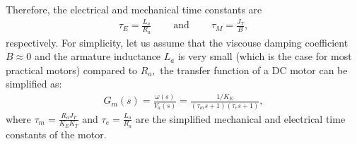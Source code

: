 %
Therefore, the electrical and mechanical time constants are %
%
\begin{align}
  \label{eq:timeConstants}
  \tau_E = \frac{L_a}{R_a}~\qquad\mathrm{and}~\qquad \tau_M = \frac{J_T}{B},
\end{align}
%
respectively. %
%
For simplicity, let us assume that the viscouse damping coefficient $B\approx 0$ and the armature inductance $L_a$ is very small (which is the case for most practical motors) compared to $R_a,$ the transfer function of a DC motor can be simplified as: %
%
\begin{align}
  G_m(s) = \frac{\omega(s)}{V_a(s)} = \frac{1/K_E}{(\tau_ms+1)(\tau_es+1)},
  \label{eq:motorTF}
\end{align}
%
where $\tau_m = \frac{R_aJ_T}{K_EK_T}$ and $\tau_e = \frac{L_a}{R_a}$ are the simplified mechanical and electrical time constants of the motor.

